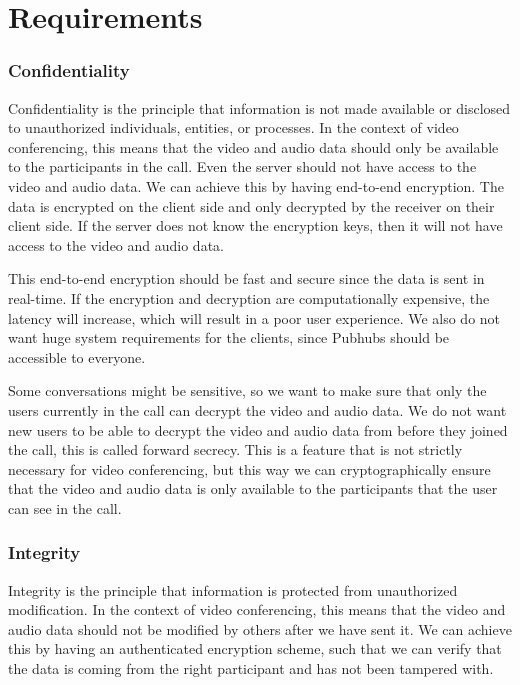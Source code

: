 \documentclass{report}
\begin{document}
\chapter{Requirements}

\subsection{Confidentiality}
Confidentiality is the principle that information is not made available or disclosed to unauthorized individuals,
entities, or processes. In the context of video conferencing, this means that the video and audio data should only
be available to the participants in the call. Even the server should not have access to the video and audio data. We
can achieve this by having end-to-end encryption. The data is encrypted on the client side and only decrypted by
the receiver on their client side. If the server does not know the encryption keys, then it will not have access to
the video and audio data.

This end-to-end encryption should be fast and secure since the data is sent in real-time. If the encryption and
decryption are computationally expensive, the latency will increase, which will result in a poor user experience. We
also do not want huge system requirements for the clients, since Pubhubs should be accessible to everyone.

Some conversations might be sensitive, so we want to make sure that only the users currently in the call can
decrypt the video and audio data. We do not want new users to be able to decrypt the video and audio data from
before they joined the call, this is called forward secrecy. This is a feature that is not strictly necessary for
video conferencing, but this way we can cryptographically ensure that the video and audio data is only available to
the participants that the user can see in the call.

\subsection{Integrity}
Integrity is the principle that information is protected from unauthorized modification. In the context of video
conferencing, this means that the video and audio data should not be modified by others after we have sent it. We can
achieve this by having an authenticated encryption scheme, such that we can verify that the data is coming from the
right participant and has not been tampered with.
\end{document}
